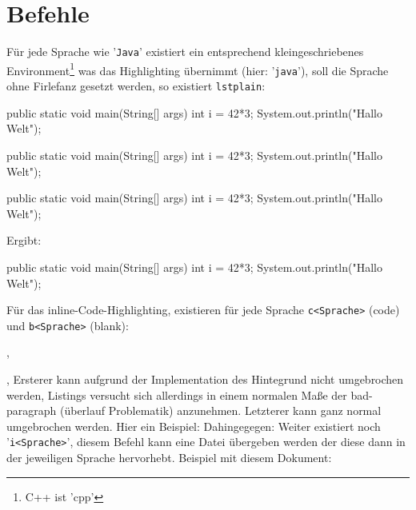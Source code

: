\documentclass{article}
\begin{document}
\section{Befehle}
Für jede Sprache wie '\verb|Java|' existiert ein entsprechend kleingeschriebenes Environment\footnote{C++ ist 'cpp'} was das Highlighting übernimmt (hier: '\verb|java|'), soll die Sprache ohne Firlefanz gesetzt werden, so existiert \verb|lstplain|:
\begin{latex}
\begin{lstplain}[language=lJava]
public static void main(String[] args) {
    int i = 42*3;
    System.out.println("Hallo Welt");
}
\end{lstplain}
\end{latex}
\begin{plainlatex}
\begin{lstplain}[language=lJava]
public static void main(String[] args) {
    int i = 42*3;
    System.out.println("Hallo Welt");
}
\end{lstplain}
\end{plainlatex}
\begin{slatex}
\begin{lstplain}[language=lJava]
public static void main(String[] args) {
    int i = 42*3;
    System.out.println("Hallo Welt");
}
\end{lstplain}
\end{slatex}
Ergibt:
\begin{lstplain}[language=lJava]
public static void main(String[] args) {
    int i = 42*3;
    System.out.println("Hallo Welt");
}
\end{lstplain}
Für das inline-Code-Highlighting, existieren für jede Sprache \verb|c<Sprache>| (code) und \verb|b<Sprache>| (blank):
\begin{latex}
, 
\end{latex}
, \newline
Ersterer kann aufgrund der Implementation des Hintegrund nicht umgebrochen werden, Listings versucht sich allerdings in einem normalen Maße der bad-paragraph (überlauf Problematik) anzunehmen. Letzterer kann ganz normal umgebrochen werden. Hier ein Beispiel:\newline
{}\newline
Dahingegegen:\newline
{}\medskip\newline
Weiter existiert noch '\verb|i<Sprache>|', diesem Befehl kann eine Datei übergeben werden der diese dann in der jeweiligen Sprache hervorhebt. Beispiel mit diesem Dokument:
\begin{latex}
\end{latex}
\end{document}
